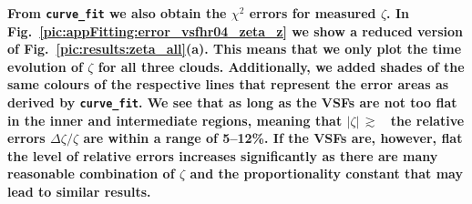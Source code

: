 \textbf{
    From \texttt{curve\_fit} we also obtain the $\chi^2$ errors for measured $\zeta$. 
    In Fig.~\ref{pic:appFitting:error_vsfhr04_zeta_z} we show a reduced version of Fig.~\ref{pic:results:zeta_all}(a).
    This means that we only plot the time evolution of $\zeta$ for all three clouds.
    Additionally, we added shades of the same colours of the respective lines that represent the error areas as derived by \texttt{curve\_fit}.
    We see that as long as the VSFs are not too flat in the inner and intermediate regions, meaning that $|\zeta|\,\gtrsim$~ the relative errors $\Delta \zeta / \zeta$ are within a range of 5--12\%. 
    If the VSFs are, however, flat the level of relative errors increases significantly as there are many reasonable combination of $\zeta$ and the proportionality constant that may lead to similar results. 
}





\endinput
